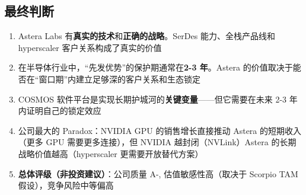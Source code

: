 \subsection{最终判断}

\begin{enumerate}
    \item Astera Labs 有\textbf{真实的技术}和\textbf{正确的战略}。SerDes 能力、全栈产品线和 hyperscaler 客户关系构成了真实的价值
    \item 在半导体行业中，``先发优势''的保护期通常在\textbf{2-3 年}。Astera 的价值取决于能否在``窗口期''内建立足够深的客户关系和生态锁定
    \item COSMOS 软件平台是实现长期护城河的\textbf{关键变量}——但它需要在未来 2-3 年内证明自己的锁定效应
    \item 公司最大的 Paradox：NVIDIA GPU 的销售增长直接推动 Astera 的短期收入（更多 GPU 需要更多连接），但 NVIDIA 越封闭（NVLink）Astera 的长期战略价值越高（hyperscaler 更需要开放替代方案）
    \item \textbf{总体评级（非投资建议）}：公司质量 A-, 估值敏感性高（取决于 Scorpio TAM 假设），竞争风险中等偏高
\end{enumerate}
